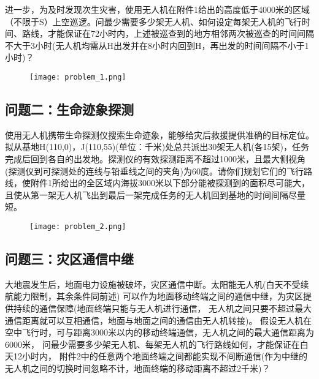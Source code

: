 进一步，为及时发现次生灾害，使用无人机在附件1给出的高度低于4000米的区域（不限于S）上空巡逻。问最少需要多少架无人机、如何设定每架无人机的飞行时间、路线，才能保证在72小时内，上述被巡查到的地方相邻两次被巡查的时间间隔不大于3小时(无人机均需从H出发并在8小时内回到H，再出发的时间间隔不小于1小时)？
\begin{figure}[!ht]
\centering
\texttt{[image: problem\_1.png]}
\end{figure}
\subsection{问题二：生命迹象探测}
使用无人机携带生命探测仪搜索生命迹象，能够给灾后救援提供准确的目标定位。拟从基地H(110,0)，J(110,55)(单位：千米)处总共派出30架无人机(各15架)，任务完成后回到各自的出发地。探测仪的有效探测距离不超过1000米，且最大侧视角(探测仪到可探测处的连线与铅垂线之间的夹角)为60度。请你们规划它们的飞行路线，使附件1所给出的全区域内海拔3000米以下部分能被探测到的面积尽可能大，且使从第一架无人机飞出到最后一架完成任务的无人机回到基地的时间间隔尽量短。
\begin{figure}[!ht]
\centering
\texttt{[image: problem\_2.png]}
\end{figure}
\subsection{问题三：灾区通信中继}
大地震发生后，地面电力设施被破坏，灾区通信中断。太阳能无人机(白天不受续航能力限制，其余条件同前述)
可以作为地面移动终端之间的通信中继，为灾区提供持续的通信保障(地面终端只能与无人机进行通信，
无人机之间只要不超过最大通信距离就可以互相通信，地面与地面之间的通信由无人机转接)。
假设无人机在空中飞行时，可与距离3000米以内的移动终端通信，无人机之间的最大通信距离为6000米，
问最少需要多少架无人机、每架无人机的飞行路线如何，才能保证在白天12小时内，
附件2中的任意两个地面终端之间都能实现不间断通信(作为中继的无人机之间的切换时间忽略不计，地面终端的移动距离不超过2千米)？
